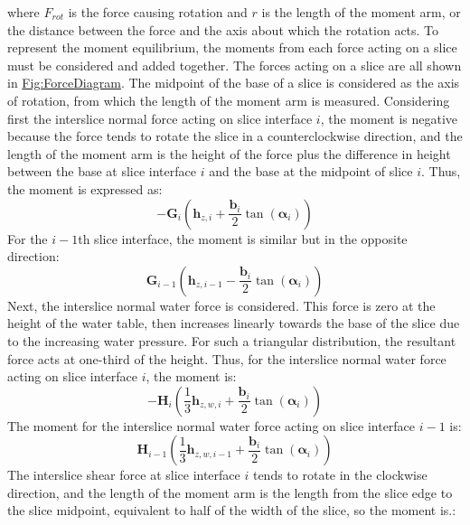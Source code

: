 \documentclass[12pt]{article}
\begin{document}
where ${F_{rot}}$ is the force causing rotation and $r$ is the length of the moment arm, or the distance between the force and the axis about which the rotation acts. To represent the moment equilibrium, the moments from each force acting on a slice must be considered and added together. The forces acting on a slice are all shown in \hyperref[Figure:ForceDiagram]{Fig:ForceDiagram}. The midpoint of the base of a slice is considered as the axis of rotation, from which the length of the moment arm is measured. Considering first the interslice normal force acting on slice interface $i$, the moment is negative because the force tends to rotate the slice in a counterclockwise direction, and the length of the moment arm is the height of the force plus the difference in height between the base at slice interface $i$ and the base at the midpoint of slice $i$. Thus, the moment is expressed as:
\begin{displaymath}
-{\mathbf{G}}_{i} \left({\mathbf{h}_{z,i}}+\frac{{\mathbf{b}}_{i}}{2} \tan\left({\mathbf{α}}_{i}\right)\right)
\end{displaymath}
For the $i-1$th slice interface, the moment is similar but in the opposite direction:
\begin{displaymath}
{\mathbf{G}}_{i-1} \left({\mathbf{h}_{z,i-1}}-\frac{{\mathbf{b}}_{i}}{2} \tan\left({\mathbf{α}}_{i}\right)\right)
\end{displaymath}
Next, the interslice normal water force is considered. This force is zero at the height of the water table, then increases linearly towards the base of the slice due to the increasing water pressure. For such a triangular distribution, the resultant force acts at one-third of the height. Thus, for the interslice normal water force acting on slice interface $i$, the moment is:
\begin{displaymath}
-{\mathbf{H}}_{i} \left(\frac{1}{3} {\mathbf{h}_{z,w,i}}+\frac{{\mathbf{b}}_{i}}{2} \tan\left({\mathbf{α}}_{i}\right)\right)
\end{displaymath}
The moment for the interslice normal water force acting on slice interface $i-1$ is:
\begin{displaymath}
{\mathbf{H}}_{i-1} \left(\frac{1}{3} {\mathbf{h}_{z,w,i-1}}+\frac{{\mathbf{b}}_{i}}{2} \tan\left({\mathbf{α}}_{i}\right)\right)
\end{displaymath}
The interslice shear force at slice interface $i$ tends to rotate in the clockwise direction, and the length of the moment arm is the length from the slice edge to the slice midpoint, equivalent to half of the width of the slice, so the moment is.:
\end{document}
